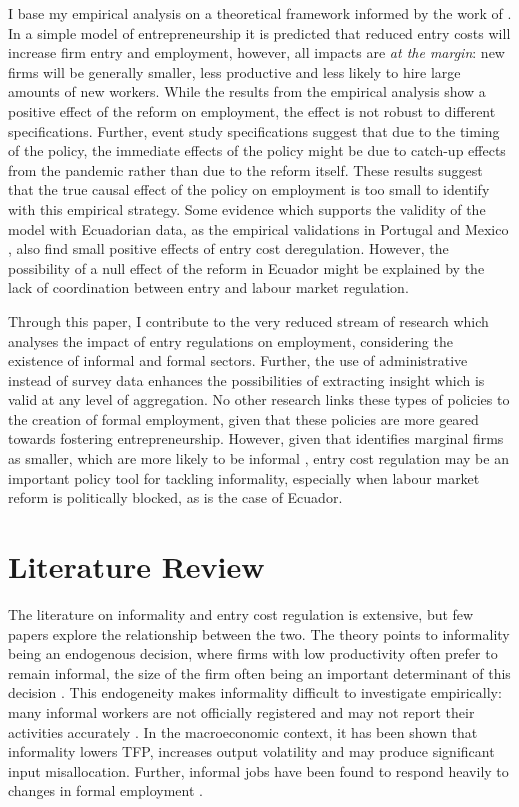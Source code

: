 \documentclass[11pt,a4paper]{article}\usepackage[]{graphicx}\usepackage[]{xcolor}
\begin{document}
I base my empirical analysis on a theoretical framework informed by the work of \textcite{Branstetter.2014}. In a simple model of entrepreneurship it is predicted that reduced entry costs will increase firm entry and employment, however, all impacts are \textit{at the margin}: new firms will be generally smaller, less productive and less likely to hire large amounts of new workers. While the results from the empirical analysis show a positive effect of the reform on employment, the effect is not robust to different specifications. Further, event study specifications suggest that due to the timing of the policy, the immediate effects of the policy might be due to catch-up effects from the pandemic rather than due to the reform itself. These results suggest that the true causal effect of the policy on employment is too small to identify with this empirical strategy. Some evidence which supports the validity of the model with Ecuadorian data, as the empirical validations in Portugal \parencite{Branstetter.2014} and Mexico \parencite{Kaplan.2011}, also find small positive effects of entry cost deregulation. However, the possibility of a null effect of the reform in Ecuador might be explained by the lack of coordination between entry and labour market regulation.

Through this paper, I contribute to the very reduced stream of research which analyses the impact of entry regulations on employment, considering the existence of informal and formal sectors. Further, the use of administrative instead of survey data enhances the possibilities of extracting insight which is valid at any level of aggregation. No other research links these types of policies to the creation of formal employment, given that these policies are more geared towards fostering entrepreneurship. However, given that \textcite{Branstetter.2014} identifies marginal firms as smaller, which are more likely to be informal \parencite{ElianeElBadaoui.2010}, entry cost regulation may be an important policy tool for tackling informality, especially when labour market reform is politically blocked, as is the case of Ecuador. 

\section{Literature Review}

The literature on informality and entry cost regulation is extensive, but few papers explore the relationship between the two. The theory points to informality being an endogenous decision, where firms with low productivity often prefer to remain informal, the size of the firm often being an important determinant of this decision \parencite{Delechat2020, MauricioPrado.2011, ElianeElBadaoui.2010}. This endogeneity makes informality difficult to investigate empirically: many informal workers are not officially registered and may not report their activities accurately \textcite{Oviedo.2009}. In the macroeconomic context, it has been shown that informality lowers TFP, increases output volatility and may produce significant input misallocation. Further, informal jobs have been found to respond heavily to changes in formal employment \parencite{Leyva.2020}.
\end{document}
